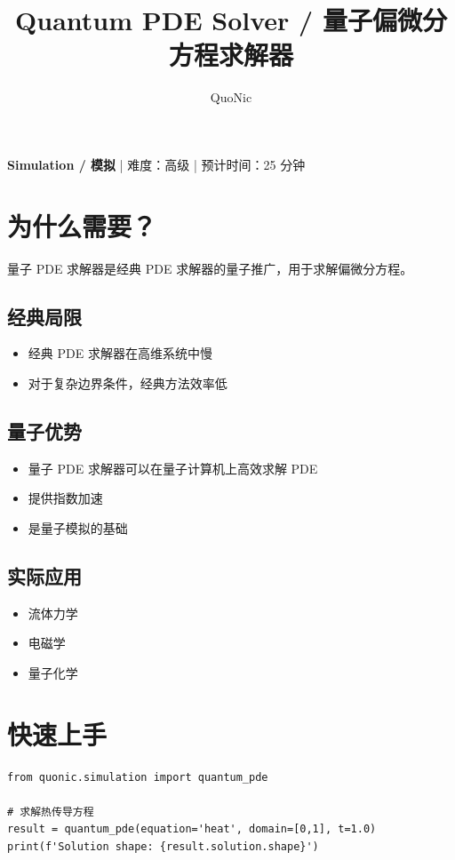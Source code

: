\documentclass[12pt,a4paper]{article}
\title{Quantum PDE Solver / 量子偏微分方程求解器}
\author{QuoNic}
\date{}
\begin{document}
\maketitle

\begin{center}
\textbf{Simulation / 模拟} | 难度：高级 | 预计时间：25 分钟
\end{center}

\tableofcontents
\newpage

\section{为什么需要？}

量子 PDE 求解器是经典 PDE 求解器的量子推广，用于求解偏微分方程。

\subsection{经典局限}
\begin{itemize}
  \item 经典 PDE 求解器在高维系统中慢
  \item 对于复杂边界条件，经典方法效率低
\end{itemize}

\subsection{量子优势}
\begin{itemize}
  \item 量子 PDE 求解器可以在量子计算机上高效求解 PDE
  \item 提供指数加速
  \item 是量子模拟的基础
\end{itemize}

\subsection{实际应用}
\begin{itemize}
  \item 流体力学
  \item 电磁学
  \item 量子化学
\end{itemize}

\section{快速上手}

\begin{verbatim}
from quonic.simulation import quantum_pde

# 求解热传导方程
result = quantum_pde(equation='heat', domain=[0,1], t=1.0)
print(f'Solution shape: {result.solution.shape}')
\end{verbatim}
\end{document}
